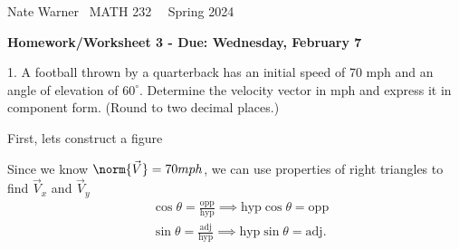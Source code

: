 \documentclass{report}
\title{\Huge{}}
\author{\huge{Nathan Warner}}
\date{\huge{}}
\begin{document}
    \pagebreak \bigbreak \noindent
    Nate Warner \ \quad \quad \quad \quad \quad \quad \quad \quad \quad \quad \quad \quad  MATH 232 \quad  \quad \quad \quad \quad \quad \quad \quad \quad \ \ \quad \quad Spring 2024
    \begin{center}
        \textbf{Homework/Worksheet 3 - Due: Wednesday, February 7}
    \end{center}
    \bigbreak \noindent 
    \begin{mdframed}
        1. A football thrown by a quarterback has an initial speed of 70 mph and an angle of elevation of $60^{\circ}$. Determine the velocity vector in mph and express it in component form. (Round to two decimal places.)
    \end{mdframed}
    \bigbreak \noindent 
    First, lets construct a figure 
    \bigbreak \noindent 
    \begin{figure}[ht]
        \centering
        \label{fig:ink2}
    \end{figure}
    \bigbreak \noindent 
    Since we know $\norm{\vec{V}} = 70mph$, we can use properties of right triangles to find $\vec{V}_{x}$ and $\vec{V}_{y}$
    \begin{align*}
        &\cos{\theta } = \frac{\text{opp}}{\text{hyp}} \implies \text{hyp}\cos{\theta} = \text{opp} \\
        &\sin{\theta } = \frac{\text{adj}}{\text{hyp}} \implies \text{hyp}\sin{\theta } = \text{adj}
    .\end{align*}
\end{document}
